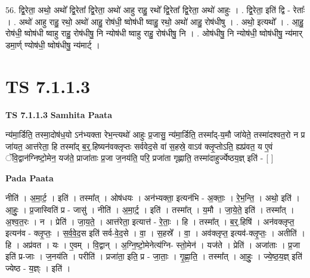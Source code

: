 \documentclass[17pt]{extarticle}
\begin{document}
56. द्वि॒रेता॒ अथो॒ अथो᳚ द्वि॒रेता᳚ द्वि॒रेता॒ अथो॑ आहु राहु॒ रथो᳚ द्वि॒रेता᳚ द्वि॒रेता॒ अथो॑ आहुः । . द्वि॒रेता॒ इति॑ द्वि - रेताः᳚ । . अथो॑ आहु राहु॒ रथो॒ अथो॑ आहु॒ रोष॑धी॒ ष्वोष॑धी ष्वाहु॒ रथो॒ अथो॑ आहु॒ रोष॑धीषु । . अथो॒ इत्यथो᳚ । . आ॒हु॒ रोष॑धी॒ ष्वोष॑धी ष्वाहु राहु॒ रोष॑धीषु॒ नि न्योष॑धी ष्वाहु राहु॒ रोष॑धीषु॒ नि । . ओष॑धीषु॒ नि न्योष॑धी॒ ष्वोष॑धीषु॒ न्य॑मार् डमा॒र्ण् ण्योष॑धी॒ ष्वोष॑धीषु॒ न्य॑मार्ट् । \newline
\pagebreak
{}

\section{ TS 7.1.1.3 }

\textbf{TS 7.1.1.3 } \newline
\textbf{Samhita Paata} \newline

न्य॑मा॒र्डिति॒ तस्मा॒दोष॑ध॒यो ऽन॑भ्यक्ता रेभ॒न्त्यथो॑ आहुः प्र॒जासु॒ न्य॑मा॒र्डिति॒ तस्मा᳚द्-य॒मौ जा॑येते॒ तस्मा॑दश्वत॒रो न प्र जा॑यत॒ आत्त॑रेता॒ हि तस्मा᳚द् ब॒र्॒.हिष्यन॑वक्लृप्तः सर्ववेद॒से वा॑ स॒हस्रे॒ वाऽव॑ क्लृ॒प्तोऽति॒ ह्यप्र॑वत॒ य ए॒वं ॅवि॒द्वान॑ग्निष्टो॒मेन॒ यज॑ते॒ प्राजा॑ताः प्र॒जा ज॒नय॑ति॒ परि॒ प्रजा॑ता गृह्णाति॒ तस्मा॑दाहुर्ज्येष्ठय॒ज्ञ् इति॑ - [  ] \newline

\textbf{Pada Paata} \newline

नीति॑ । अ॒मा॒र्ट॒ । इति॑ । तस्मा᳚त् । ओष॑धयः । अन॑भ्यक्ता॒ इत्यन॑भि - अ॒क्ताः॒ । रे॒भ॒न्ति॒ । अथो॒ इति॑ । आ॒हुः॒ । प्र॒जास्विति॑ प्र - जासु॑ । नीति॑ । अ॒मा॒र्ट्॒ । इति॑ । तस्मा᳚त् । य॒मौ । जा॒ये॒ते॒ इति॑ । तस्मा᳚त् । अ॒श्व॒त॒रः । न । प्रेति॑ । जा॒य॒ते॒ । आत्त॑रेता॒ इत्यात्त॑ - रे॒ताः॒ । हि । तस्मा᳚त् । ब॒र्॒.हिषि॑ । अन॑वक्लृप्त॒ इत्यन॑व - क्लृ॒प्तः॒ । स॒र्व॒वे॒द॒स इति॑ सर्व-वे॒द॒से । वा॒ । स॒हस्रे᳚ । वा॒ । अव॑क्लृप्त॒ इत्यव॑-क्लृ॒प्तः॒ । अतीति॑ । हि । अप्र॑वत । यः । ए॒वम् । वि॒द्वान् । अ॒ग्नि॒ष्टो॒मेनेत्य॑ग्नि- स्तो॒मेन॑ । यज॑ते । प्रेति॑ । अजा॑ताः । प्र॒जा इति॑ प्र-जाः । ज॒नय॑ति । परीति॑ । प्रजा॑ता॒ इति॒ प्र - जा॒ताः॒ । गृ॒ह्णा॒ति॒ । तस्मा᳚त् । आ॒हुः॒ । ज्ये॒ष्ठ॒य॒ज्ञ् इति॑ ज्येष्ठ - य॒ज्ञ्ः । इति॑ ।  \newline
\end{document}
